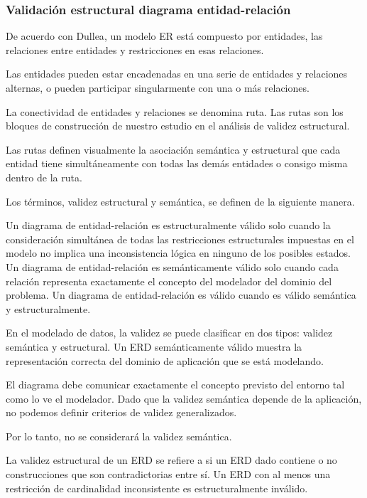 \subsubsection{Validación estructural diagrama entidad-relación}

De acuerdo con Dullea\cite{dullea_analysis_2003}, un modelo ER está compuesto por entidades, las relaciones entre entidades y restricciones en esas relaciones. 


Las entidades pueden estar encadenadas en una serie de entidades y relaciones alternas, o pueden participar singularmente con una o más relaciones. 


La conectividad de entidades y relaciones se denomina ruta. Las rutas son los bloques de construcción de nuestro estudio en el análisis de validez estructural.


Las rutas definen visualmente la asociación semántica y estructural que cada entidad tiene simultáneamente con todas las demás entidades o consigo misma dentro de la ruta.

Los términos, validez estructural y semántica, se definen de la siguiente manera.

\theoremstyle{definition}
\begin{definition}{}
    Un diagrama de entidad-relación es estructuralmente válido solo cuando la consideración simultánea de todas las restricciones estructurales impuestas en el modelo no implica una inconsistencia lógica en ninguno de los posibles estados. Un diagrama de entidad-relación es semánticamente válido solo cuando cada relación representa exactamente el concepto del modelador del dominio del problema. Un diagrama de entidad-relación es válido cuando es válido semántica y estructuralmente.
\end{definition}


En el modelado de datos, la validez se puede clasificar en dos tipos: validez semántica y estructural. Un ERD semánticamente válido muestra la representación correcta del dominio de aplicación que se está modelando.


El diagrama debe comunicar exactamente el concepto previsto del entorno tal como lo ve el modelador. Dado que la validez semántica depende de la aplicación, no podemos definir criterios de validez generalizados.


Por lo tanto, no se considerará la validez semántica.


La validez estructural de un ERD se refiere a si un ERD dado contiene o no construcciones que son contradictorias entre sí. Un ERD con al menos una restricción de cardinalidad inconsistente es estructuralmente inválido.


